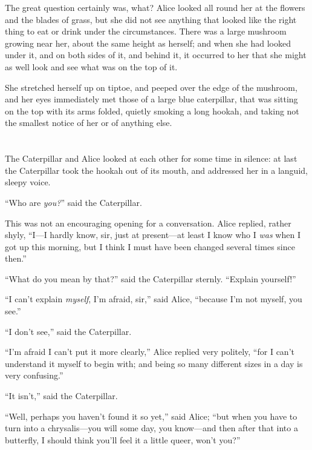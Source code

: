 \documentclass[book, 20pt]{extbook}
\begin{document}
The great question certainly was, what? Alice looked all round her at
the flowers and the blades of grass, but she did not see anything that
looked like the right thing to eat or drink under the circumstances.
There was a large mushroom growing near her, about the same height as
herself; and when she had looked under it, and on both sides of it, and
behind it, it occurred to her that she might as well look and see what
was on the top of it.

She stretched herself up on tiptoe, and peeped over the edge of the
mushroom, and her eyes immediately met those of a large blue
caterpillar, that was sitting on the top with its arms folded, quietly
smoking a long hookah, and taking not the smallest notice of her or of
anything else.

\chapter*{}


The Caterpillar and Alice looked at each other for some time in silence:
at last the Caterpillar took the hookah out of its mouth, and addressed
her in a languid, sleepy voice.

``Who are \emph{you?}'' said the Caterpillar.

This was not an encouraging opening for a conversation. Alice replied,
rather shyly, ``I---I hardly know, sir, just at present---at least I
know who I \emph{was} when I got up this morning, but I think I must
have been changed several times since then.''

``What do you mean by that?'' said the Caterpillar sternly. ``Explain
yourself!''

``I can't explain \emph{myself}, I'm afraid, sir,'' said Alice,
``because I'm not myself, you see.''

``I don't see,'' said the Caterpillar.

``I'm afraid I can't put it more clearly,'' Alice replied very politely,
``for I can't understand it myself to begin with; and being so many
different sizes in a day is very confusing.''

``It isn't,'' said the Caterpillar.

``Well, perhaps you haven't found it so yet,'' said Alice; ``but when
you have to turn into a chrysalis---you will some day, you know---and
then after that into a butterfly, I should think you'll feel it a little
queer, won't you?''
\end{document}

